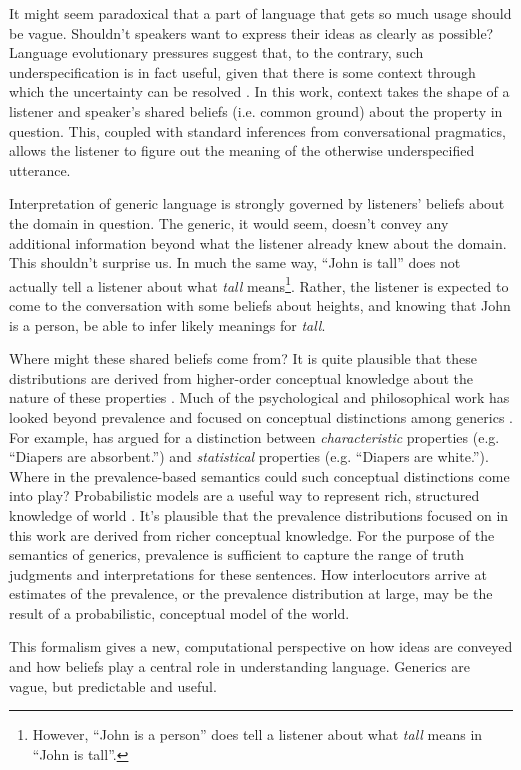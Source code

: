 \documentclass[10pt,letterpaper]{article}
\begin{document}
It might seem paradoxical that a part of language that gets so much usage should be vague. 
Shouldn't speakers want to express their ideas as clearly as possible?
Language evolutionary pressures suggest that, to the contrary, such underspecification is in fact useful, given that there is some context through which the uncertainty can be resolved \cite{Piantadosi2012}.
In this work, context takes the shape of a listener and speaker's shared beliefs (i.e. common ground) about the property in question. 
This, coupled with standard inferences from conversational pragmatics, allows the listener to figure out the meaning of the otherwise underspecified utterance.

Interpretation of generic language is strongly governed by listeners' beliefs about the domain in question. 
The generic, it would seem, doesn't convey any additional information beyond what the listener already knew about the domain.
This shouldn't surprise us. 
In much the same way, ``John is tall'' does not actually tell a listener about what \emph{tall} means\footnote{However, ``John is a person'' does tell a listener about what \emph{tall} means in ``John is tall''.}. 
Rather, the listener is expected to come to the conversation with some beliefs about heights, and knowing that John is a person, be able to infer likely meanings for \emph{tall}.

Where might these shared beliefs come from?
It is quite plausible that these distributions are derived from higher-order conceptual knowledge about the nature of these properties \cite{Gelman2005, Keil1992}.
Much of the psychological and philosophical work has looked beyond prevalence and focused on conceptual distinctions among generics \cite{Prasada2013, Leslie2008}. For example, \citeauthor{Prasada2013} has argued for a distinction between \emph{characteristic} properties (e.g. ``Diapers are absorbent.'') and \emph{statistical} properties (e.g. ``Diapers are white.'').
 Where in the prevalence-based semantics could such conceptual distinctions come into play?
Probabilistic models are a useful way to represent rich, structured knowledge of world \cite{Goodmanconcepts}. It's plausible that the prevalence distributions focused on in this work are derived from richer conceptual knowledge. For the purpose of the semantics of generics, prevalence is sufficient to capture the range of truth judgments  and interpretations for these sentences. How interlocutors arrive at estimates of the prevalence, or the prevalence distribution at large, may be the result of a probabilistic, conceptual model of the world. 

This formalism gives a new, computational perspective on how ideas are conveyed and how beliefs play a central role in understanding language.
Generics are vague, but predictable and useful.




\setlength{\bibleftmargin}{.125in}
\setlength{\bibindent}{-\bibleftmargin}


\end{document}
